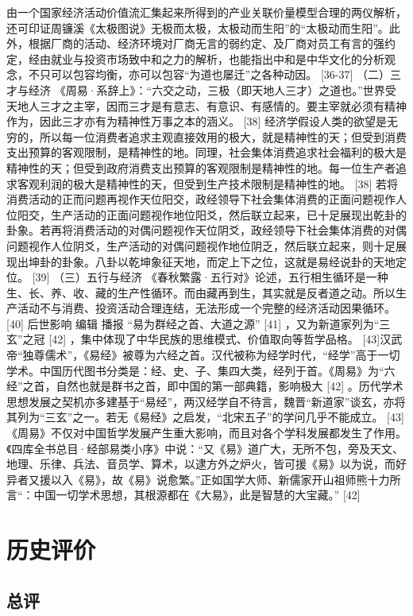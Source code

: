 \documentclass[a4paper,12pt,UTF8,twoside]{ctexbook}
\begin{document}
由一个国家经济活动价值流汇集起来所得到的产业关联价量模型合理的两仪解析，还可印证周镰溪《太极图说》无极而太极，太极动而生阳”的“太极动而生阳”。此外，根据厂商的活动、经济环境对厂商无言的弱约定、及厂商对员工有言的强约定，经由就业与投资市场致中和之力的解析，也能指出中和是中华文化的分析观念，不只可以包容均衡，亦可以包容“为道也屡迁”之各种动因。 [36-37]
（二）三才与经济
《周易·系辞上》：“六交之动，三极（即天地人三才）之道也。”世界受天地人三才之主宰，因而三才是有意志、有意识、有感情的。要主宰就必须有精神作为，因此三才亦有为精神性万事之本的涵义。 [38]
经济学假设人类的欲望是无穷的，所以每一位消费者追求主观直接效用的极大，就是精神性的天；但受到消费支出预算的客观限制，是精神性的地。同理，社会集体消费追求社会福利的极大是精神性的天；但受到政府消费支出预算的客观限制是精神性的地。每一位生产者追求客观利润的极大是精神性的天，但受到生产技术限制是精神性的地。 [38]
若将消费活动的正而问题再视作天位阳交，政经领导下社会集体消费的正面问题视作人位阳交，生产活动的正面问题视作地位阳爻，然后联立起来，已十足展现出乾卦的卦象。若再将消费活动的对偶问题视作天位阴爻，政经领导下社会集体消费的对偶问题视作人位阴爻，生产活动的对偶问题视作地位阴乏，然后联立起来，则十足展现出坤卦的卦象。八卦以乾坤象征天地，而定上下之位，这就是易经说卦的天地定位。 [39]
（三）五行与经济
《春秋繁露·五行对》论述，五行相生循环是一种生、长、养、收、藏的生产性循环。而由藏再到生，其实就是反者道之动。所以生产活动不与消费、投资活动合理连结，无法形成一个完整的经济活动因果循环。 [40]
后世影响
编辑
播报
“易为群经之首、大道之源” [41]
，又为新道家列为“三玄”之冠 [42] ，集中体现了中华民族的思维模式、价值取向等哲学品格。 [43]汉武帝“独尊儒术”，《易经》被尊为六经之首。汉代被称为经学时代，“经学”高于一切学术。中国历代图书分类是：经、史、子、集四大类，经列于首。《周易》为“六经”之首，自然也就是群书之首，即中国的第一部典籍，影响极大 [42] 。历代学术思想发展之契机亦多建基于“易经”，两汉经学自不待言，魏晋“新道家”谈玄，亦将其列为“三玄”之一。若无《易经》之启发，“北宋五子”的学问几乎不能成立。 [43]《周易》不仅对中国哲学发展产生重大影响，而且对各个学科发展都发生了作用。《四库全书总目·经部易类小序》中说：“又《易》道广大，无所不包，旁及天文、地理、乐律、兵法、音员学、算术，以逮方外之炉火，皆可援《易》以为说，而好异者又援以入《易》，故《易》说愈繁。”正如国学大师、新儒家开山祖师熊十力所言“：中国一切学术思想，其根源都在《大易》，此是智慧的大宝藏。” [42]

\section{历史评价}

\subsection{总评}
\end{document}
